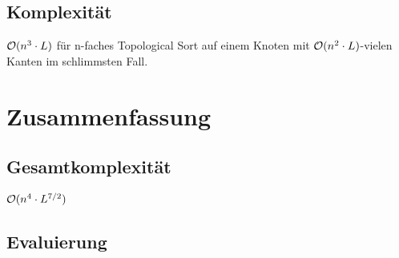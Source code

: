 \subsection{Komplexität}

$\mathcal{O}(n^3\cdot L)$ für n-faches Topological Sort auf einem Knoten mit $\mathcal{O}(n^2\cdot L)$-vielen Kanten im schlimmsten Fall.

\section{Zusammenfassung}

\subsection{Gesamtkomplexität}
$\mathcal{O}(n^4\cdot L^{7/2})$ 

\subsection{Evaluierung}
